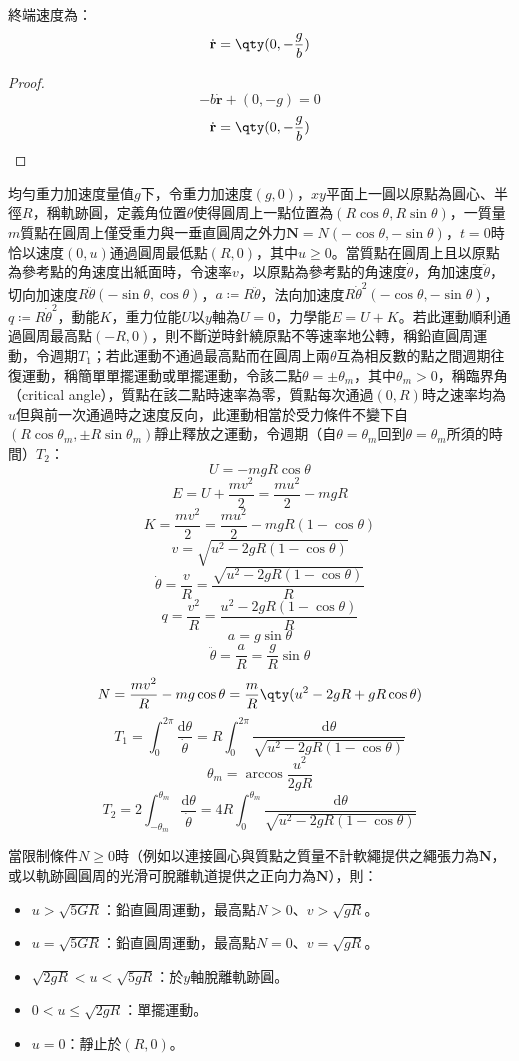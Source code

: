 \documentclass[a4paper,12pt]{article}
\begin{document}
終端速度為：
\[\dot{\mathbf{r}}=\qty(0,-\frac{g}{b})\]
\begin{proof}
\[-b\dot{\mathbf{r}}+(0,-g)=0\]
\[\dot{\mathbf{r}}=\qty(0,-\frac{g}{b})\]
\end{proof}
均勻重力加速度量值$g$下，令重力加速度$(g,0)$，$xy$平面上一圓以原點為圓心、半徑$R$，稱軌跡圓，定義角位置$\theta$使得圓周上一點位置為$(R\cos\theta,R\sin\theta)$，一質量$m$質點在圓周上僅受重力與一垂直圓周之外力$\mathbf{N}=N(-\cos\theta,-\sin\theta)$，$t=0$時恰以速度$(0,u)$通過圓周最低點$(R,0)$，其中$u\geq 0$。當質點在圓周上且以原點為參考點的角速度出紙面時，令速率$v$，以原點為參考點的角速度$\dot{\theta}$，角加速度$\ddot{\theta}$，切向加速度$R\ddot{\theta}(-\sin\theta,\cos\theta)$，$a\coloneq R\ddot{\theta}$，法向加速度$R\dot{\theta}^2(-\cos\theta,-\sin\theta)$，$q\coloneq R\dot{\theta}^2$，動能$K$，重力位能$U$以$y$軸為$U=0$，力學能$E=U+K$。若此運動順利通過圓周最高點$(-R,0)$，則不斷逆時針繞原點不等速率地公轉，稱鉛直圓周運動，令週期$T_1$；若此運動不通過最高點而在圓周上兩$\theta$互為相反數的點之間週期往復運動，稱簡單單擺運動或單擺運動，令該二點$\theta=\pm\theta_m$，其中$\theta_m>0$，稱臨界角（critical angle），質點在該二點時速率為零，質點每次通過$(0,R)$時之速率均為$u$但與前一次通過時之速度反向，此運動相當於受力條件不變下自$(R\cos\theta_m,\pm R\sin\theta_m)$靜止釋放之運動，令週期（自$\theta=\theta_m$回到$\theta=\theta_m$所須的時間）$T_2$：
\[U=-mgR\cos\theta\]
\[E=U+\frac{mv^2}{2}=\frac{mu^2}{2}-mgR\]
\[K=\frac{mv^2}{2}=\frac{mu^2}{2}-mgR(1-\cos\theta)\]
\[v=\sqrt{u^2-2gR(1-\cos\theta)}\]
\[\dot{\theta}=\frac{v}{R}=\frac{\sqrt{u^2-2gR(1-\cos\theta)}}{R}\]
\[q=\frac{v^2}{R}=\frac{u^2-2gR(1-\cos\theta)}{R}\]
\[a=g\sin\theta\]
\[\ddot{\theta}=\frac{a}{R}=\frac{g}{R}\sin\theta\]
\[N=\frac{mv^2}{R}-mg\cos\theta=\frac{m}{R}\qty(u^2-2gR+gR\cos\theta)\]
\[T_1=\int_0^{2\pi}\frac{\mathrm{d}\theta}{\dot{\theta}}=R\int_0^{2\pi}\frac{\mathrm{d}\theta}{\sqrt{u^2-2gR(1-\cos\theta)}}\]
\[\theta_m=\arccos\frac{u^2}{2gR}\]
\[T_2=2\int_{-\theta_m}^{\theta_m}\frac{\mathrm{d}\theta}{\dot{\theta}}=4R\int_0^{\theta_m}\frac{\mathrm{d}\theta}{\sqrt{u^2-2gR(1-\cos\theta)}}\]

當限制條件$N\geq 0$時（例如以連接圓心與質點之質量不計軟繩提供之繩張力為$\mathbf{N}$，或以軌跡圓圓周的光滑可脫離軌道提供之正向力為$\mathbf{N}$），則：
\begin{itemize}
\item $u>\sqrt{5GR}$：鉛直圓周運動，最高點$N>0$、$v>\sqrt{gR}$。
\item $u=\sqrt{5GR}$：鉛直圓周運動，最高點$N=0$、$v=\sqrt{gR}$。
\item $\sqrt{2gR}<u<\sqrt{5gR}$：於$y$軸脫離軌跡圓。
\item $0<u\leq\sqrt{2gR}$：單擺運動。
\item $u=0$：靜止於$(R,0)$。
\end{itemize}
\end{document}
